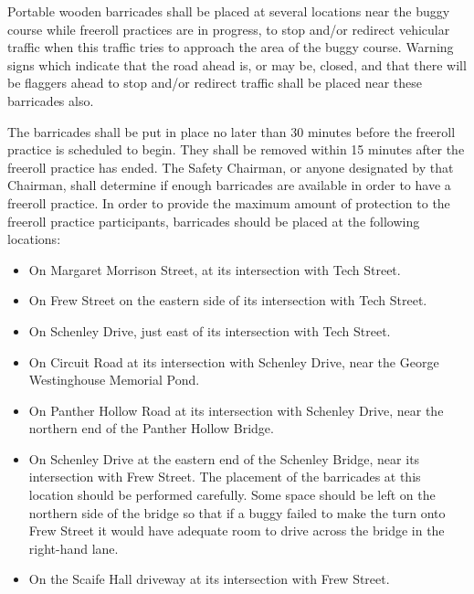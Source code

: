 	Portable wooden barricades shall be placed at several locations near the buggy
	course while freeroll practices are in progress, to stop and/or redirect
	vehicular traffic when this traffic tries to approach the area of the buggy
	course. Warning signs which indicate that the road ahead is, or may be, closed,
	and that there will be flaggers ahead to stop and/or redirect traffic shall be
	placed near these barricades also.

	The barricades shall be put in place no later than 30 minutes before the
	freeroll practice is scheduled to begin. They shall be removed within 15
	minutes after the freeroll practice has ended. The Safety Chairman, or anyone
	designated by that Chairman, shall determine if enough barricades are available
	in order to have a freeroll practice. In order to provide the maximum amount of
	protection to the freeroll practice participants, barricades should be placed
	at the following locations:

	\begin{itemize}

		\item On Margaret Morrison Street, at its intersection with Tech Street.

		\item On Frew Street on the eastern side of its intersection with Tech
		Street.

		\item On Schenley Drive, just east of its intersection with Tech Street.

		\item On Circuit Road at its intersection with Schenley Drive, near the
		George Westinghouse Memorial Pond.

		\item On Panther Hollow Road at its intersection with Schenley Drive, near
		the northern end of the Panther Hollow Bridge.

		\item On Schenley Drive at the eastern end of the Schenley Bridge, near its
		intersection with Frew Street. The placement of the barricades at this location
		should be performed carefully. Some space should be left on the northern side
		of the bridge so that if a buggy failed to make the turn onto Frew Street it
		would have adequate room to drive across the bridge in the right-hand lane.

		\item On the Scaife Hall driveway at its intersection with Frew Street.

	\end{itemize}

